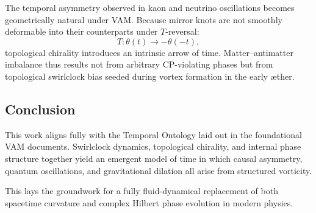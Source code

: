The temporal asymmetry observed in kaon and neutrino oscillations becomes geometrically natural under VAM. Because mirror knots are not smoothly deformable into their counterparts under $T$-reversal:
\[
T: \theta(t) \rightarrow -\theta(-t),
\]
topological chirality introduces an intrinsic arrow of time. Matter--antimatter imbalance thus results not from arbitrary CP-violating phases but from topological swirlclock bias seeded during vortex formation in the early æther.

\subsection*{Conclusion}

This work aligns fully with the Temporal Ontology laid out in the foundational VAM documents. Swirlclock dynamics, topological chirality, and internal phase structure together yield an emergent model of time in which causal asymmetry, quantum oscillations, and gravitational dilation all arise from structured vorticity.

This lays the groundwork for a fully fluid-dynamical replacement of both spacetime curvature and complex Hilbert phase evolution in modern physics.